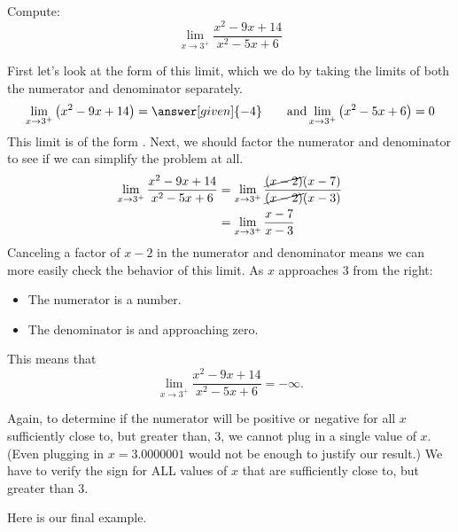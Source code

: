 \documentclass{ximera}
\begin{document}
\begin{example}
  Compute:
  \[
  \lim_{x\to 3^+} \frac{x^2-9x+14}{x^2-5x+6}
  \]
  \begin{explanation}
    First let's look at the form of this limit, which we do by taking the limits of both the numerator and denominator separately.
    \[
    \lim_{x\to 3^+} \left(x^2-9x+14\right) = \answer[given]{-4}\qquad\text{and}\lim_{x\to3^+}\left(x^2-5x+6\right) = 0
    \]
    This limit is of the form \numOverZero. Next, we should factor the numerator and denominator to see if we can simplify the problem at all. 
    \begin{align*}
      \lim_{x\to 3^+}\frac{x^2-9x+14}{x^2-5x+6} &= \lim_{x\to 3^+}\frac{\cancel{(x-2)}(x-7)}{\cancel{(x-2)}(x-3)}\\
      &= \lim_{x\to 3^+}\frac{x-7}{x-3}
    \end{align*}
    Canceling a factor of $x-2$ in the numerator and denominator
    means we can more easily check the behavior of this limit.  As $x$
    approaches $3$ from the right:
    \begin{itemize}
    \item The numerator is a  number. 
    \item The denominator is  and approaching zero.
    \end{itemize}
    This means that
    \[
    \lim_{x\to 3^+} \frac{x^2-9x+14}{x^2-5x+6} = -\infty.
    \]
   \end{explanation}
\end{example}
Again, to determine if the numerator will be positive or negative for all $x$ sufficiently close to, but greater than, $3$, we cannot plug in a single value of $x$. (Even plugging in $x=3.0000001$ would not be enough to justify our result.) We have to verify the sign for ALL values of $x$ that are sufficiently close to, but greater than $3$.

Here is our final example.
\end{document}
